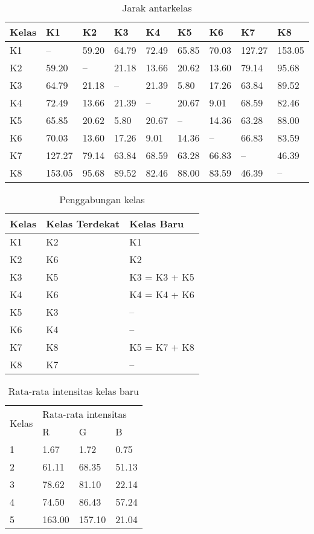 \documentclass[laporan.tex]{subfiles}
\begin{document}
\begin{table}[h]
\centering
\begin{tabular}{|l|l|l|l|l|l|l|l|l|}
\hline
Kelas & K1 & K2 & K3 & K4 & K5 & K6 & K7 & K8 \\
\hline
K1 & -- & 59.20 & 64.79 & 72.49 & 65.85 & 70.03 & 127.27 & 153.05 \\
K2 & 59.20 & -- & 21.18 & 13.66 & 20.62 & 13.60 & 79.14 & 95.68 \\
K3 & 64.79 & 21.18 & --	& 21.39 & 5.80 & 17.26 & 63.84 & 89.52 \\
K4 & 72.49 & 13.66 & 21.39 & --	& 20.67 & 9.01 & 68.59 & 82.46 \\
K5 & 65.85 & 20.62 & 5.80 & 20.67 & -- & 14.36 & 63.28 & 88.00 \\
K6 & 70.03 & 13.60 & 17.26 & 9.01 & 14.36 & -- & 66.83 & 83.59 \\
K7 & 127.27 & 79.14 & 63.84 & 68.59 & 63.28 & 66.83 & -- & 46.39 \\
K8 & 153.05 & 95.68 & 89.52 & 82.46 & 88.00 & 83.59 & 46.39 & -- \\
\hline
\end{tabular}
\caption{Jarak antarkelas}
\label{table:clsdist}
\end{table}

\begin{table}[h]
\centering
\begin{tabular}{|l|l|l|}
\hline
Kelas & Kelas Terdekat & Kelas Baru \\
\hline
K1 & K2 & K1 \\
K2 & K6 & K2 \\
K3 & K5 & K3 = K3 + K5 \\
K4 & K6 & K4 = K4 + K6 \\
K5 & K3 & -- \\
K6 & K4 & -- \\
K7 & K8 & K5 = K7 + K8 \\
K8 & K7 & -- \\
\hline
\end{tabular}
\caption{Penggabungan kelas}
\label{table:newclass}
\end{table}

\begin{table}[h]
\centering
\begin{tabular}{|l|l|l|l|}
\cline{1-4}
\multirow{2}{*}{Kelas} & \multicolumn{3}{l|}{Rata-rata intensitas} \\
\cline{2-4}
 & R & G & B \\
\cline{1-4}
1 & 1.67 & 1.72 & 0.75 \\
2 & 61.11 & 68.35 & 51.13 \\
3 & 78.62 & 81.10 & 22.14 \\
4 & 74.50 & 86.43 & 57.24 \\
5 & 163.00 & 157.10 & 21.04 \\
\cline{1-4}
\end{tabular}
\caption{Rata-rata intensitas kelas baru}
\label{table:newclassavg}
\end{table}
\end{document}
